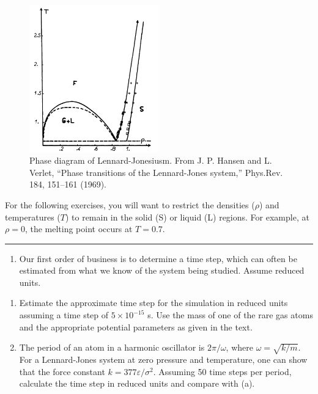 \documentclass[11pt]{article}
\providecommand{\tightlist}{%
      \setlength{\itemsep}{0pt}\setlength{\parskip}{0pt}}
\begin{document}
\begin{figure}
\centering
\caption{Phase diagram of Lennard-Jonesiusm. From J. P. Hansen and L. Verlet,
``Phase transitions of the Lennard-Jones system,'' Phys.Rev. 184,
151--161 (1969).}
\includegraphics[width=0.5\textwidth]{./figs/LJ-phase.png}
\end{figure}

For the following exercises, you will want to restrict the densities
(\(\rho\)) and temperatures (\(T\)) to remain in the solid (S) or liquid
(L) regions. For example, at \(\rho=0\), the melting point occurs at
\(T=0.7\).

\begin{center}\rule{0.5\linewidth}{0.5pt}\end{center}

\begin{enumerate}
\def\labelenumi{\arabic{enumi}.}
\setcounter{enumi}{3}
\tightlist
\item
  Our first order of business is to determine a time step, which can
  often be estimated from what we know of the system being studied.
  Assume reduced units.
\end{enumerate}

\begin{enumerate}
\def\labelenumi{\alph{enumi})}
\item
  Estimate the approximate time step for the simulation in reduced units
  assuming a time step of \(5\times 10^{-15}\) s. Use the mass of one of
  the rare gas atoms and the appropriate potential parameters as given
  in the text.
\item
  The period of an atom in a harmonic oscillator is \(2\pi/\omega\),
  where \(\omega = \sqrt{k/m}\). For a Lennard-Jones system at zero
  pressure and temperature, one can show that the force constant
  \(k=377\varepsilon/\sigma^2\). Assuming 50 time steps per period,
  calculate the time step in reduced units and compare with (a).
\end{enumerate}
\end{document}
